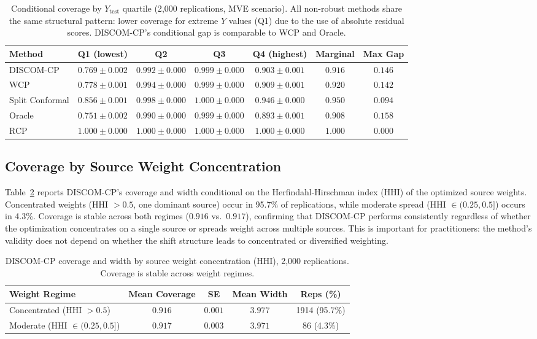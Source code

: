 \documentclass{article}
\newcommand{\DISCOM}{\textsc{DISCOM-CP}}
\begin{document}
\begin{table}[h]
\caption{Conditional coverage by $Y_{\text{test}}$ quartile (2{,}000 replications, MVE scenario). All non-robust methods share the same structural pattern: lower coverage for extreme $Y$ values (Q1) due to the use of absolute residual scores. \DISCOM{}'s conditional gap is comparable to WCP and Oracle.}
\label{tab:conditional}
\centering
\small
\begin{tabular}{lcccccc}
\toprule
\textbf{Method} & \textbf{Q1 (lowest)} & \textbf{Q2} & \textbf{Q3} & \textbf{Q4 (highest)} & \textbf{Marginal} & \textbf{Max Gap} \\
\midrule
\DISCOM{} & $0.769 \pm 0.002$ & $0.992 \pm 0.000$ & $0.999 \pm 0.000$ & $0.903 \pm 0.001$ & $0.916$ & $0.146$ \\
WCP & $0.778 \pm 0.001$ & $0.994 \pm 0.000$ & $0.999 \pm 0.000$ & $0.909 \pm 0.001$ & $0.920$ & $0.142$ \\
Split Conformal & $0.856 \pm 0.001$ & $0.998 \pm 0.000$ & $1.000 \pm 0.000$ & $0.946 \pm 0.000$ & $0.950$ & $0.094$ \\
Oracle & $0.751 \pm 0.002$ & $0.990 \pm 0.000$ & $0.999 \pm 0.000$ & $0.893 \pm 0.001$ & $0.908$ & $0.158$ \\
RCP & $1.000 \pm 0.000$ & $1.000 \pm 0.000$ & $1.000 \pm 0.000$ & $1.000 \pm 0.000$ & $1.000$ & $0.000$ \\
\bottomrule
\end{tabular}
\end{table}

\subsection*{Coverage by Source Weight Concentration}

Table~\ref{tab:concentration} reports \DISCOM{}'s coverage and width conditional on the Herfindahl-Hirschman index (HHI) of the optimized source weights. Concentrated weights (HHI $> 0.5$, one dominant source) occur in 95.7\% of replications, while moderate spread (HHI $\in (0.25, 0.5]$) occurs in 4.3\%. Coverage is stable across both regimes ($0.916$ vs.\ $0.917$), confirming that DISCOM-CP performs consistently regardless of whether the optimization concentrates on a single source or spreads weight across multiple sources. This is important for practitioners: the method's validity does not depend on whether the shift structure leads to concentrated or diversified weighting.

\begin{table}[h]
\caption{\DISCOM{} coverage and width by source weight concentration (HHI), 2{,}000 replications. Coverage is stable across weight regimes.}
\label{tab:concentration}
\centering
\small
\begin{tabular}{lcccc}
\toprule
\textbf{Weight Regime} & \textbf{Mean Coverage} & \textbf{SE} & \textbf{Mean Width} & \textbf{Reps (\%)} \\
\midrule
Concentrated (HHI $> 0.5$) & $0.916$ & $0.001$ & $3.977$ & 1914 (95.7\%) \\
Moderate (HHI $\in (0.25, 0.5]$) & $0.917$ & $0.003$ & $3.971$ & 86 (4.3\%) \\
\bottomrule
\end{tabular}
\end{table}
\end{document}
